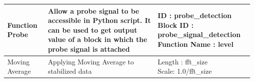 \begin{table}[h]
{\begin{tabular}{|p{}|p{}|p{}|}
Function Probe                            & Allow a probe signal to be accessible in Python script. It can be used to get output value of a block in which the probe signal is attached & \makecell[lt]{ID : probe\_detection \\ Block ID : probe\_signal\_detection \\ Function Name : level}                        \\ \hline
Moving Average                            & Applying Moving Average to stabilized data                                                                                                  & \makecell[lt]{Length : fft\_size \\ Scale: 1.0/fft\_size}                                                                 \\ \hline
\end{tabular}%
}
\end{table}